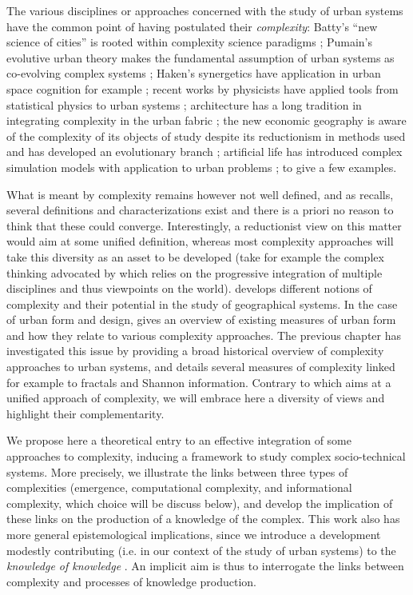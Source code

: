 \documentclass[graybox]{svmult}
\begin{document}
The various disciplines or approaches concerned with the study of urban systems have the common point of having postulated their \emph{complexity}: Batty's ``new science of cities'' is rooted within complexity science paradigms \cite{batty2007cities,batty2013new}; Pumain's evolutive urban theory makes the fundamental assumption of urban systems as co-evolving complex systems \cite{pumain2017geography,pumain1997pour}; Haken's synergetics have application in urban space cognition for example \cite{e18060197}; recent works by physicists have applied tools from statistical physics to urban systems \cite{west2017scale}; architecture has a long tradition in integrating complexity in the urban fabric \cite{alexander1977pattern}; the new economic geography is aware of the complexity of its objects of study despite its reductionism in methods used \cite{krugman1994complex} and has developed an evolutionary branch \cite{cooke2018evolutionary}; artificial life has introduced complex simulation models with application to urban problems \cite{raimbault2014hybrid}; to give a few examples.

What is meant by complexity remains however not well defined, and as \cite{chu2008criteria} recalls, several definitions and characterizations exist and there is a priori no reason to think that these could converge. Interestingly, a reductionist view on this matter would aim at some unified definition, whereas most complexity approaches will take this diversity as an asset to be developed (take for example the complex thinking advocated by \cite{morin1991methode} which relies on the progressive integration of multiple disciplines and thus viewpoints on the world). \cite{manson2001simplifying} develops different notions of complexity and their potential in the study of geographical systems. In the case of urban form and design, \cite{Boeing2018} gives an overview of existing measures of urban form and how they relate to various complexity approaches. The previous chapter \cite{batty2018which} has investigated this issue by providing a broad historical overview of complexity approaches to urban systems, and details several measures of complexity linked for example to fractals and Shannon information. Contrary to \cite{Ladyman2013} which aims at a unified approach of complexity, we will embrace here a diversity of views and highlight their complementarity.


We propose here a theoretical entry to an effective integration of some approaches to complexity, inducing a framework to study complex socio-technical systems. More precisely, we illustrate the links between three types of complexities (emergence, computational complexity, and informational complexity, which choice will be discuss below), and develop the implication of these links on the production of a knowledge of the complex. This work also has more general epistemological implications, since we introduce a development modestly contributing (i.e. in our context of the study of urban systems) to the \emph{knowledge of knowledge} \cite{edgar1986methode}. An implicit aim is thus to interrogate the links between complexity and processes of knowledge production.
\end{document}
